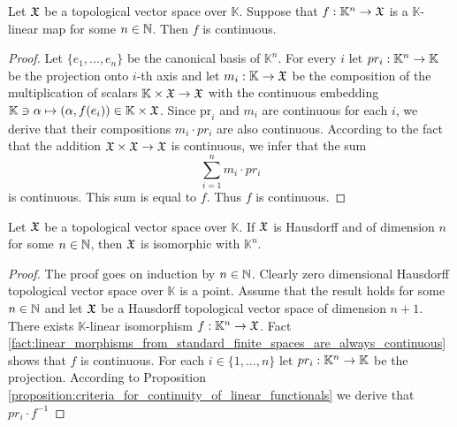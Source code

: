\begin{fact}\label{fact:linear_morphisms_from_standard_finite_spaces_are_always_continuous}
Let ${\mathfrak X}$ be a topological vector space over $\mathbb{K}$. Suppose that $f:\mathbb{K}^n \rightarrow {\mathfrak X}$ is a $\mathbb{K}$-linear map for some $n\in {\mathbb N}$. Then $f$ is continuous.
\end{fact}
\begin{proof}
Let $\{e_1,...,e_n\}$ be the canonical basis of $\mathbb{K}^n$. For every $i$ let $pr_i:\mathbb{K}^n\rightarrow \mathbb{K}$ be the projection onto $i$-th axis and let $m_{i}:\mathbb{K}\rightarrow {\mathfrak X}$ be the composition of the multiplication of scalars $\mathbb{K}\times {\mathfrak X}\rightarrow {\mathfrak X}$ with the continuous embedding $\mathbb{K} \ni \alpha \mapsto \left(\alpha, f(e_i)\right) \in \mathbb{K}\times {\mathfrak X}$. Since $\mathrm{pr}_i$ and $m_{i}$ are continuous for each $i$, we derive that their compositions $m_{i}\cdot pr_i$ are also continuous. According to the fact that the addition ${\mathfrak X}\times {\mathfrak X}\rightarrow {\mathfrak X}$ is continuous, we infer that the sum
$$\sum_{i=1}^n m_{i}\cdot pr_{i}$$
is continuous. This sum is equal to $f$. Thus $f$ is continuous. 
\end{proof}

\begin{corollary}\label{corollary:uniqueness_of_finite_dimensional_Hausdorff_top_vec_spaces}
Let ${\mathfrak X}$ be a topological vector space over $\mathbb{K}$. If ${\mathfrak X}$ is Hausdorff and of dimension $n$ for some $n\in {\mathbb N}$, then ${\mathfrak X}$ is isomorphic with $\mathbb{K}^n$.
\end{corollary}
\begin{proof}
The proof goes on induction by $n\in {\mathbb N}$. Clearly zero dimensional Hausdorff topological vector space over $\mathbb{K}$ is a point. Assume that the result holds for some $n\in {\mathbb N}$ and let ${\mathfrak X}$ be a Hausdorff topological vector space of dimension $n+1$.\\   
There exists $\mathbb{K}$-linear isomorphism $f:\mathbb{K}^n\rightarrow {\mathfrak X}$. Fact \ref{fact:linear_morphisms_from_standard_finite_spaces_are_always_continuous} shows that $f$ is continuous. For each $i\in \{1,...,n\}$ let $pr_i:\mathbb{K}^n\rightarrow \mathbb{K}$ be the projection. According to Proposition \ref{proposition:criteria_for_continuity_of_linear_functionals} we derive that $pr_i\cdot f^{-1}$ 
\end{proof}










